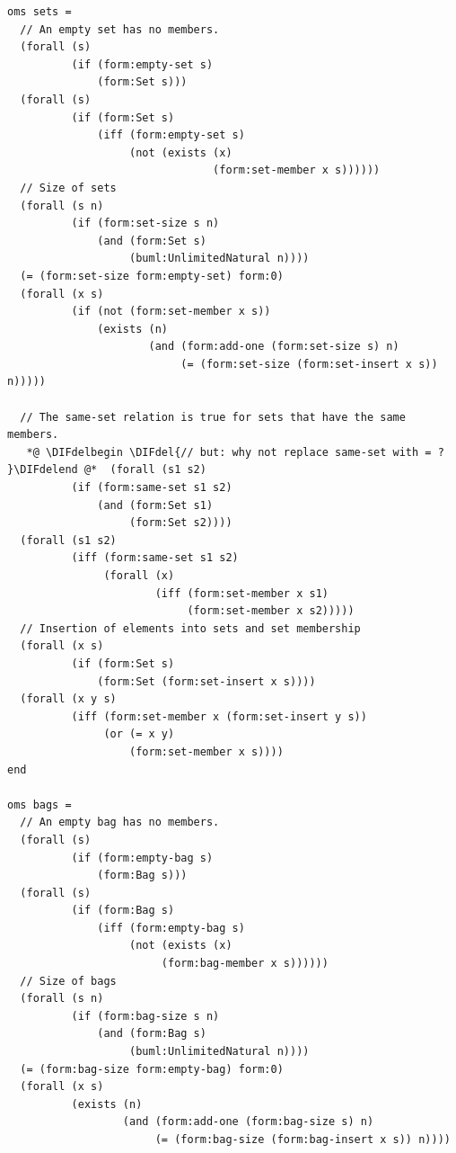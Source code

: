 \documentclass[10pt,fleqn,final]{scrreprt}
\newenvironment{definitions}[0]{\medskip }{}
\providecommand{\DIFdel}[1]{{\protect\color{red}\sout{#1}}}                      %
\providecommand{\DIFdelbegin}{} %
\providecommand{\DIFdelend}{} %
\begin{document}
\begin{definitions}
\begin{lstlisting}[language=clif,morekeywords={then,with,logic,oms,end},mathescape]
oms sets =
  // An empty set has no members.
  (forall (s)
          (if (form:empty-set s)
              (form:Set s)))
  (forall (s)
          (if (form:Set s)
              (iff (form:empty-set s)
                   (not (exists (x)
                                (form:set-member x s))))))
  // Size of sets
  (forall (s n)
          (if (form:set-size s n)
              (and (form:Set s)
                   (buml:UnlimitedNatural n))))
  (= (form:set-size form:empty-set) form:0)
  (forall (x s)
          (if (not (form:set-member x s))
              (exists (n)
                      (and (form:add-one (form:set-size s) n)
                           (= (form:set-size (form:set-insert x s)) n)))))

  // The same-set relation is true for sets that have the same members.
   *@ \DIFdelbegin \DIFdel{// but: why not replace same-set with = ?
}\DIFdelend @*  (forall (s1 s2)
          (if (form:same-set s1 s2)
              (and (form:Set s1)
                   (form:Set s2))))
  (forall (s1 s2)
          (iff (form:same-set s1 s2)
               (forall (x)
                       (iff (form:set-member x s1)
                            (form:set-member x s2)))))
  // Insertion of elements into sets and set membership
  (forall (x s)
          (if (form:Set s)
              (form:Set (form:set-insert x s))))
  (forall (x y s)
          (iff (form:set-member x (form:set-insert y s))
               (or (= x y)
                   (form:set-member x s))))
end

oms bags =
  // An empty bag has no members.
  (forall (s)
          (if (form:empty-bag s)
              (form:Bag s)))
  (forall (s)
          (if (form:Bag s)
              (iff (form:empty-bag s)
                   (not (exists (x)
                        (form:bag-member x s))))))
  // Size of bags
  (forall (s n)
          (if (form:bag-size s n)
              (and (form:Bag s)
                   (buml:UnlimitedNatural n))))
  (= (form:bag-size form:empty-bag) form:0)
  (forall (x s)
          (exists (n)
                  (and (form:add-one (form:bag-size s) n)
                       (= (form:bag-size (form:bag-insert x s)) n))))


\end{lstlisting}
\end{definitions}
\end{document}
